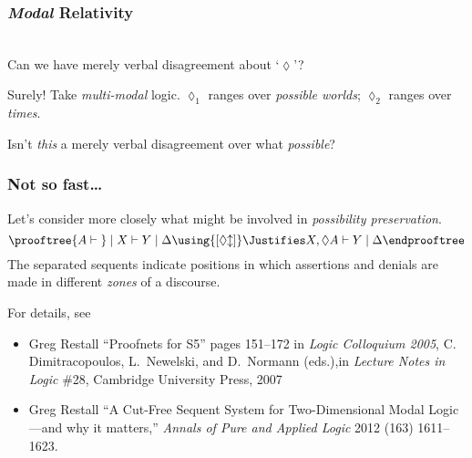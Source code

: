 \documentclass{beamer} %
\def\Dia{\lozenge}
\begin{document}
\begin{frame}\frametitle{\emph{Modal} Relativity}
\begin{center}
\\[4mm]\pause
Can we have merely verbal disagreement about `$\Dia$'?
\end{center}\pause
Surely! \pause
Take \emph{multi-modal} logic. $\Dia_1$ ranges over \emph{possible worlds}; $\Dia_2$ ranges over \emph{times}.\\[4mm]\pause

Isn't \emph{this} a merely verbal disagreement over what \emph{possible}? 
\end{frame}

\begin{frame}\frametitle{Not so fast\ldots}
Let's consider more closely what might be involved in \emph{possibility preservation}.
\[
\prooftree
{A\vdash\;}\;|\;X\vdash Y\;|\;{\Delta}
\using{[\mathord{\Dia}\mathord{\updownarrow}]}\Justifies
X,\Dia A\vdash Y \;|\; {\Delta}
\endprooftree
\]
The separated sequents indicate positions in which assertions and denials are made in different \emph{zones} of a discourse.

\footnotesize\medskip\pause For details, see
\begin{itemize}
\item Greg Restall ``Proofnets for S5'' pages 151–172 in \emph{Logic Colloquium 2005}, C. Dimitracopoulos, L.~Newelski, and D.~Normann (eds.),in \emph{Lecture Notes in Logic} \#28, Cambridge University Press, 2007 \guillemotleft{}\guillemotright
\item Greg Restall ``A Cut-Free Sequent System for Two-Dimensional Modal Logic---and why it matters,'' \emph{Annals of Pure and Applied Logic} 2012 (163) 1611--1623. \guillemotleft{}\guillemotright
\end{itemize}

\end{frame}
\end{document}
